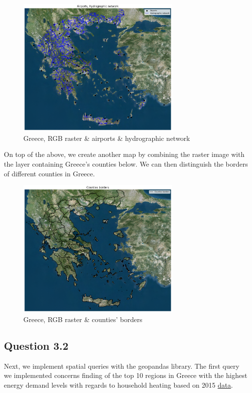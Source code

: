 \begin{figure}[h]
    \centering
    \includegraphics[width=8.1cm]{figures/q3_1_Greece_RGB_map_airports_hydrographic.png}
    \caption{Greece, RGB raster & airports & hydrographic network}
    \label{fig:Greece, RGB raster & airports & hydrographic network}
\end{figure}
\FloatBarrier %

On top of the above, we create another map by combining the raster image with the layer containing Greece's counties below. We can then distinguish the borders of different counties in Greece. 

\begin{figure}[h]
    \centering
    \includegraphics[width=8.1cm]{figures/q3_1_Greece_RGB_map_counties.png}
    \caption{Greece, RGB raster & counties' borders}
    \label{fig:Greece, RGB raster & counties' borders}
\end{figure}
\FloatBarrier %

\subsection{Question 3.2}
Next, we implement spatial queries with the geopandas library. The first query we implemented concerns finding of the top 10 regions in Greece with the highest energy demand levels with regards to household heating based on 2015 \href{https://geodata.gov.gr/en/dataset/zetese-energeias-gia-thermanse-apo-noikokuria/resource/b53ed012-b842-47e7-9eee-851624b1a014}{data}.  

